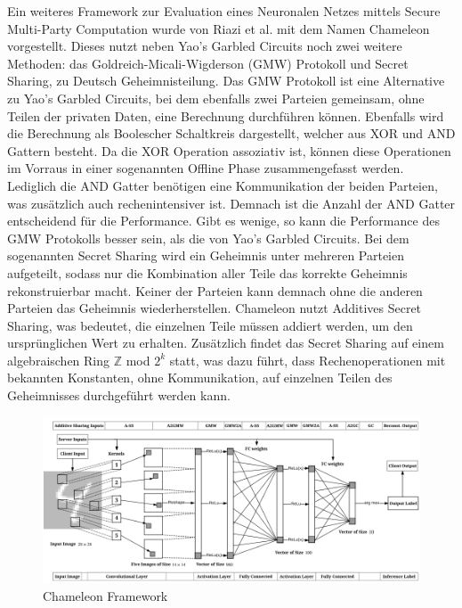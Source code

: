 Ein weiteres Framework zur Evaluation eines Neuronalen Netzes mittels Secure Multi-Party Computation wurde von Riazi et al. \cite{P-72} mit dem Namen Chameleon vorgestellt.
Dieses nutzt neben Yao's Garbled Circuits noch zwei weitere Methoden: das Goldreich-Micali-Wigderson (GMW) Protokoll und Secret Sharing, zu Deutsch Geheimnisteilung.
Das GMW Protokoll ist eine Alternative zu Yao's Garbled Circuits, bei dem ebenfalls zwei Parteien gemeinsam, ohne Teilen der privaten Daten, eine Berechnung durchführen können.
Ebenfalls wird die Berechnung als Boolescher Schaltkreis dargestellt, welcher aus XOR und AND Gattern besteht. 
Da die XOR Operation assoziativ ist, können diese Operationen im Vorraus in einer sogenannten Offline Phase zusammengefasst werden. 
Lediglich die AND Gatter benötigen eine Kommunikation der beiden Parteien, was zusätzlich auch rechenintensiver ist.
Demnach ist die Anzahl der AND Gatter entscheidend für die Performance.
Gibt es wenige, so kann die Performance des GMW Protokolls besser sein, als die von Yao's Garbled Circuits.
Bei dem sogenannten Secret Sharing wird ein Geheimnis unter mehreren Parteien aufgeteilt, sodass nur die Kombination aller Teile das korrekte Geheimnis rekonstruierbar macht.
Keiner der Parteien kann demnach ohne die anderen Parteien das Geheimnis wiederherstellen. 
Chameleon nutzt Additives Secret Sharing, was bedeutet, die einzelnen Teile müssen addiert werden, um den ursprünglichen Wert zu erhalten.
Zusätzlich findet das Secret Sharing auf einem algebraischen Ring $\mathbb{Z}$ mod $2^{k} $ statt, was dazu führt, dass Rechenoperationen mit bekannten Konstanten, ohne Kommunikation, auf einzelnen Teilen des Geheimnisses durchgeführt werden kann.

\begin{figure}[!htb]
    \centering
    \includegraphics[width=15.2cm]{figures/chameleon.png}
    \caption{Chameleon Framework \cite{P-72}}
    \label{fig:chameleon}
\end{figure} 

